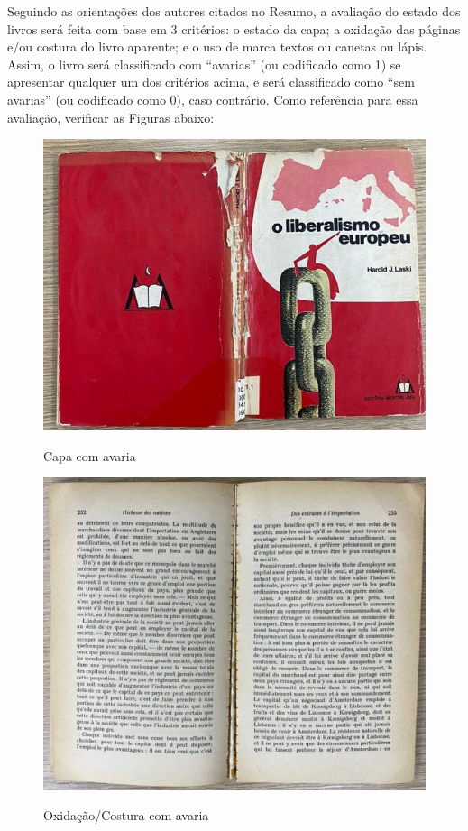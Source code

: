 \documentclass[a4paper, 12pt]{article}
\begin{document}
Seguindo as orientações dos autores citados no Resumo, a avaliação do estado dos livros será feita com 
base em 3 critérios: o estado da capa; a oxidação das páginas e/ou costura do livro aparente; e o uso de marca textos ou canetas ou lápis. Assim, o livro será classificado com “avarias” (ou codificado como 1) se apresentar qualquer um dos critérios acima, e será classificado como “sem avarias” (ou codificado como 0), caso contrário. Como referência para essa avaliação, verificar as Figuras abaixo:

\begin{figure}[H]
    \centering
    \caption{Capa com avaria}
    \includegraphics[scale=.6]{figura1.png}
        \label{figura1}
\end{figure}

\begin{figure}[H]
    \centering
    \caption{Oxidação/Costura com avaria}
    \includegraphics[scale=.7]{figura2.png}
        \label{figura2}
\end{figure}
\end{document}
